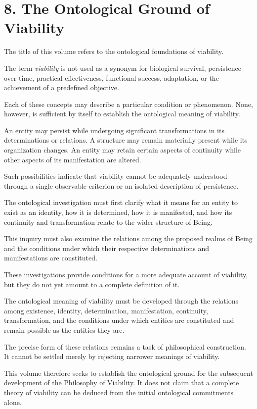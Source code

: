 \section*{8. The Ontological Ground of Viability}

The title of this volume refers to the ontological
foundations of viability.

The term \textit{viability} is not used as a synonym
for biological survival, persistence over time,
practical effectiveness, functional success,
adaptation, or the achievement of a predefined
objective.

Each of these concepts may describe a particular
condition or phenomenon. None, however, is
sufficient by itself to establish the ontological
meaning of viability.

An entity may persist while undergoing significant
transformations in its determinations or relations.
A structure may remain materially present while
its organization changes. An entity may retain
certain aspects of continuity while other aspects
of its manifestation are altered.

Such possibilities indicate that viability cannot
be adequately understood through a single
observable criterion or an isolated description
of persistence.

The ontological investigation must first clarify
what it means for an entity to exist as an identity,
how it is determined, how it is manifested, and
how its continuity and transformation relate
to the wider structure of Being.

This inquiry must also examine the relations
among the proposed realms of Being and the
conditions under which their respective
determinations and manifestations are constituted.

These investigations provide conditions for
a more adequate account of viability, but they
do not yet amount to a complete definition of it.

The ontological meaning of viability must be
developed through the relations among existence,
identity, determination, manifestation, continuity,
transformation, and the conditions under which
entities are constituted and remain possible
as the entities they are.

The precise form of these relations remains
a task of philosophical construction. It cannot
be settled merely by rejecting narrower meanings
of viability.

This volume therefore seeks to establish the
ontological ground for the subsequent development
of the Philosophy of Viability. It does not claim
that a complete theory of viability can be deduced
from the initial ontological commitments alone.

